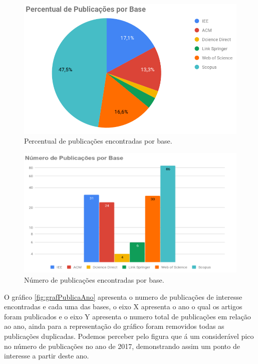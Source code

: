 \documentclass[tid,table]{texufpel} %
\begin{document}
\begin{figure}[ht]
	\centering
	\includegraphics[width=.9\textwidth]{imagens/GrafPizPubAno.png}
	\caption{Percentual de publicações encontradas por base.}
	\label{fig:GrafPizPubAno}
\end{figure}

\begin{figure}[ht]
	\centering
	\includegraphics[width=.9\textwidth]{imagens/GrafBarraPubAno.png}
	\caption{Número de publicações encontradas por base.}
	\label{fig:GrafBarraPubAno}
\end{figure}


O gráfico \ref{fig:grafPublicaAno} apresenta o numero de publicações de interesse encontradas e cada uma das bases, o eixo X apresenta o ano o qual os artigos foram publicados e o eixo Y apresenta o numero total de publicações em relação ao ano, ainda para a representação do gráfico foram removidos todas as publicações duplicadas. Podemos perceber pelo figura que á um considerável pico no número de publicações no ano de 2017, demonstrando assim um ponto de interesse a partir deste ano.
\end{document}
